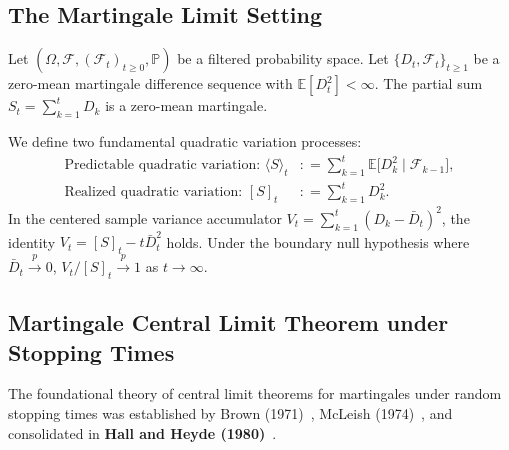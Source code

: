 \documentclass[11pt,a4paper]{article}
\newcommand{\coloneqq}{\mathrel{\mathop:}=}
\begin{document}
\subsection{The Martingale Limit Setting}
Let $(\Omega, \mathcal{F}, (\mathcal{F}_t)_{t \ge 0}, \mathbb{P})$ be a filtered probability space. Let $\{D_t, \mathcal{F}_t\}_{t \ge 1}$ be a zero-mean martingale difference sequence with $\mathbb{E}[D_t^2] < \infty$. The partial sum $S_t = \sum_{k=1}^t D_k$ is a zero-mean martingale.

We define two fundamental quadratic variation processes:
\begin{align}
\text{Predictable quadratic variation: } \langle S \rangle_t &\coloneqq \sum_{k=1}^t \mathbb{E}\big[ D_k^2 \;\big|\; \mathcal{F}_{k-1} \big], \label{eq:angle_bracket} \\
\text{Realized quadratic variation: } [S]_t &\coloneqq \sum_{k=1}^t D_k^2. \label{eq:square_bracket}
\end{align}
In the centered sample variance accumulator $V_t = \sum_{k=1}^t (D_k - \bar{D}_t)^2$, the identity $V_t = [S]_t - t \bar{D}_t^2$ holds. Under the boundary null hypothesis where $\bar{D}_t \xrightarrow{p} 0$, $V_t / [S]_t \xrightarrow{p} 1$ as $t \to \infty$.

\subsection{Martingale Central Limit Theorem under Stopping Times}
The foundational theory of central limit theorems for martingales under random stopping times was established by Brown (1971)~\cite{brown1971}, McLeish (1974)~\cite{mcleish1974}, and consolidated in \textbf{Hall and Heyde (1980)}~\cite{hall1980martingale}.
\end{document}
